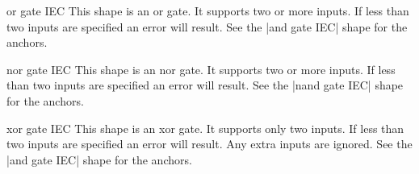 \begin{shape}{or gate IEC}
  This shape is an or gate. It supports two or more inputs.
  If less than two inputs are specified an error will result. 
	See the |and gate IEC| shape for the anchors.
	
\begin{codeexample}[]
\end{codeexample} 

\end{shape}


\begin{shape}{nor gate IEC}
  This shape is an nor gate. It supports two or more inputs.
  If less than two inputs are specified an error will result. 
	See the |nand gate IEC| shape for the anchors.
	
\begin{codeexample}[]
\end{codeexample}

\end{shape}

\begin{shape}{xor gate IEC}
  This shape is an xor gate. It supports only two inputs.
   If less than two inputs are specified an error will result.
  Any extra inputs are ignored.  
		See the |and gate IEC| shape for the anchors.
	
\begin{codeexample}[]
\end{codeexample}

\end{shape}


